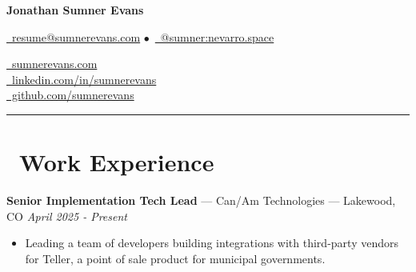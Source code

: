 \documentclass[10pt,letterpaper]{article}
\begin{document}
\begin{minipage}[b][][b]{0.5\linewidth}
    {\huge\textbf{Jonathan Sumner Evans}}

    \vspace{5pt}
    \href{mailto:resume@sumnerevans.com}{\faEnvelope\ resume@sumnerevans.com}
    $\bullet$\ \href{https://matrix.to/#/@sumner:nevarro.space}{\faMatrixOrg\ @sumner:nevarro.space}
\end{minipage}\hfill
\begin{minipage}[b][][b]{0.278\linewidth}
    \href{https://sumnerevans.com}{\faGlobe\ sumnerevans.com} \\
    \href{https://www.linkedin.com/in/sumnerevans}{\faLinkedin\ linkedin.com/in/sumnerevans} \\
    \href{https://github.com/sumnerevans}{\faGithub\ github.com/sumnerevans}
\end{minipage}
\rule{\textwidth}{0.5pt}

\section*{\faBriefcase\ Work Experience}
{\fontsize{11}{0}
\textbf{Senior Implementation Tech Lead} --- Can/Am Technologies --- Lakewood, CO}
\hfill \textit{April 2025 - Present}
\begin{itemize}
    \item Leading a team of developers building integrations with third-party
        vendors for Teller, a point of sale product for municipal governments.
\end{itemize}
\end{document}
